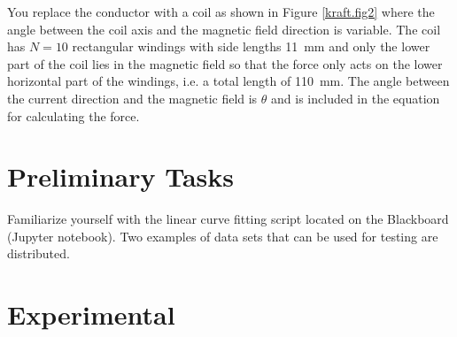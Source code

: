\documentclass[../Elmag-labhefte-2020.tex]{subfiles}
\begin{document}
You replace the conductor with a coil as shown in Figure \ref{kraft.fig2} where the angle between the coil axis and the magnetic field direction is variable. The coil has $N = 10$ rectangular windings with side lengths \SI{11}{\mm} and only the lower part of the coil lies in the magnetic field so that the force only acts on the lower horizontal part of the windings, i.e. a total length of \SI{110}{\mm}. The angle between the current direction and the magnetic field is $\theta$ and is included in the equation for calculating the force.








\section{Preliminary Tasks}
Familiarize yourself with the linear curve fitting script located on the Blackboard (Jupyter notebook). Two examples of data sets that can be used for testing are distributed.

\section{Experimental \label{ch.kraft.eksp}}
\end{document}

